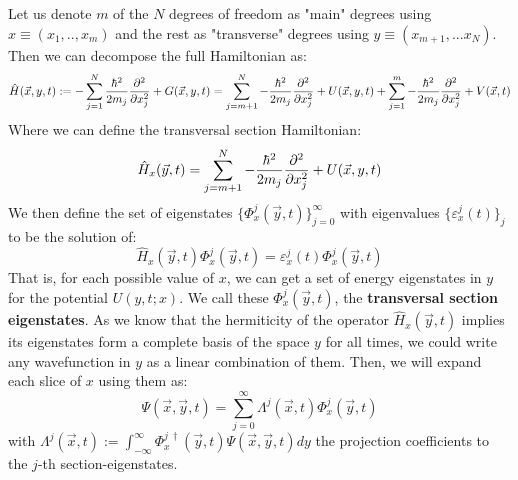 \documentclass[11pt, a4paper]{article} %
\begin{document}
Let us denote $m$ of the $N$ degrees of freedom as "main" degrees using $x\equiv(x_1,..,x_m)$ and the rest as "transverse" degrees using $y\equiv(x_{m+1},...x_N)$. Then we can decompose the full Hamiltonian as:
\begin{equation}
\hat{H}(\vec{x}, y, t):= -\sum_{j=1}^N\frac{\hbar^2}{2m_j}\pdv[2]{}{x_j}+G(\vec{x}, y, t)=\sum_{j=m+1}^{N}-\frac{\hbar^2}{2m_j}\pdv[2]{}{x_j}+U(\vec{x}, y, t)+\sum_{j=1}^{m}-\frac{\hbar^2}{2m_j}\pdv[2]{}{x_j}+V(\vec{x},t)
\end{equation}
Where we can define the transversal section Hamiltonian:\vspace{-0.05cm}
\begin{equation}
\hat{H}_x(\vec{y},t)=\sum_{j=m+1}^{N}-\frac{\hbar^2}{2m_j}\pdv[2]{}{x_j}+U(\vec{x}, y, t)
\end{equation} \vspace{-0.2cm}
We then define the set of eigenstates $\{\Phi^j_x(\vec{y},t)\}_{j=0}^\infty$ with eigenvalues $\{\varepsilon_x^j(t)\}_j$ to be the solution of:\vspace{0.2cm}
\begin{equation}\label{transvE}
\hat{H}_x(\vec{y},t)\Phi^j_x(\vec{y},t)=\varepsilon^j_x(t)\Phi^j_x(\vec{y},t)
\end{equation}
That is, for each possible value of $x$, we can get a set of energy eigenstates in $y$ for the potential $U(y,t;x)$. We call these $\Phi^j_x(\vec{y},t)$, the {\bf transversal section eigenstates}. As we know that the hermiticity of the operator $\hat{H}_x(\vec{y},t)$ implies its eigenstates form a complete basis of the space $y$ for all times, we could write any wavefunction in $y$ as a linear combination of them. Then, we will expand each slice of $x$ using them as:\vspace{-0.2cm}
\begin{equation}\label{BHExp}
\Psi(\vec{x},\vec{y},t)=\sum_{j=0}^\infty \Lambda^j(\vec{x},t) \Phi^j_x(\vec{y},t)
\end{equation}\vspace{-0.2cm}
with $\Lambda^j(\vec{x},t):= \int_{-\infty}^{\infty}\Phi^{j\ \dagger}_x(\vec{y},t) \Psi(\vec{x},\vec{y},t)dy$ the projection coefficients to the $j$-th section-eigenstates.
\end{document}
